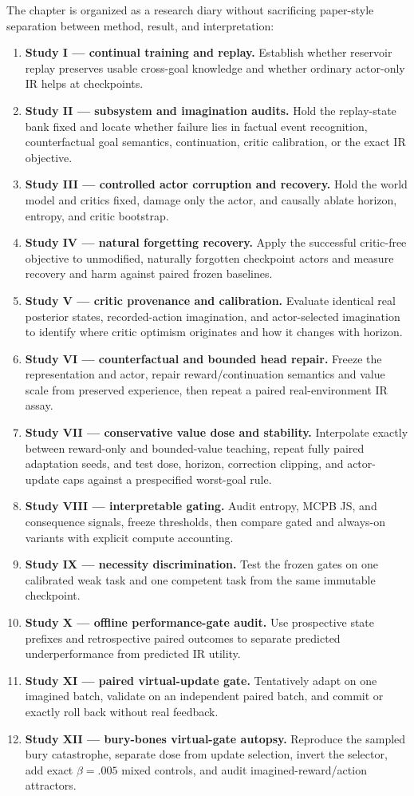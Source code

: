 \documentclass[10pt]{article}
\begin{document}
The chapter is organized as a research diary without sacrificing paper-style separation between method, result, and interpretation:
\begin{enumerate}
  \item \textbf{Study I --- continual training and replay.} Establish whether reservoir replay preserves usable cross-goal knowledge and whether ordinary actor-only IR helps at checkpoints.
  \item \textbf{Study II --- subsystem and imagination audits.} Hold the replay-state bank fixed and locate whether failure lies in factual event recognition, counterfactual goal semantics, continuation, critic calibration, or the exact IR objective.
  \item \textbf{Study III --- controlled actor corruption and recovery.} Hold the world model and critics fixed, damage only the actor, and causally ablate horizon, entropy, and critic bootstrap.
  \item \textbf{Study IV --- natural forgetting recovery.} Apply the successful critic-free objective to unmodified, naturally forgotten checkpoint actors and measure recovery and harm against paired frozen baselines.
  \item \textbf{Study V --- critic provenance and calibration.} Evaluate identical real posterior states, recorded-action imagination, and actor-selected imagination to identify where critic optimism originates and how it changes with horizon.
  \item \textbf{Study VI --- counterfactual and bounded head repair.} Freeze the representation and actor, repair reward/continuation semantics and value scale from preserved experience, then repeat a paired real-environment IR assay.
  \item \textbf{Study VII --- conservative value dose and stability.} Interpolate exactly between reward-only and bounded-value teaching, repeat fully paired adaptation seeds, and test dose, horizon, correction clipping, and actor-update caps against a prespecified worst-goal rule.
  \item \textbf{Study VIII --- interpretable gating.} Audit entropy, MCPB JS, and consequence signals, freeze thresholds, then compare gated and always-on variants with explicit compute accounting.
  \item \textbf{Study IX --- necessity discrimination.} Test the frozen gates on one calibrated weak task and one competent task from the same immutable checkpoint.
  \item \textbf{Study X --- offline performance-gate audit.} Use prospective state prefixes and retrospective paired outcomes to separate predicted underperformance from predicted IR utility.
  \item \textbf{Study XI --- paired virtual-update gate.} Tentatively adapt on one imagined batch, validate on an independent paired batch, and commit or exactly roll back without real feedback.
  \item \textbf{Study XII --- bury-bones virtual-gate autopsy.} Reproduce the sampled bury catastrophe, separate dose from update selection, invert the selector, add exact $\beta=.005$ mixed controls, and audit imagined-reward/action attractors.
\end{enumerate}
\end{document}

